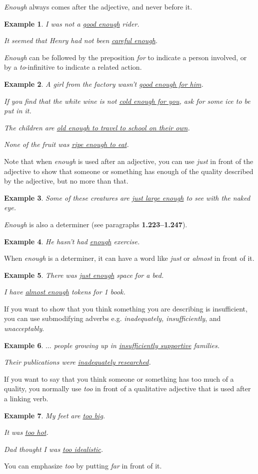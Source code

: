 \documentclass[oneside]{book}
\numberwithin{equation}{section}
\newtheorem{example}{Example}[section]
\begin{document}
\textit{Enough} always comes after the adjective, and never before it.
\begin{example}
    I was not a \underline{good enough} rider.
    
    It seemed that Henry had not been \underline{careful enough}.
\end{example}
\textit{Enough} can be followed by the preposition \textit{for} to indicate a person involved, or by a \textit{to}-infinitive to indicate a related action.
\begin{example}
    A girl from the factory wasn't \underline{good enough for him}.
    
    If you find that the white wine is not \underline{cold enough for you}, ask for some ice to be put in it.
    
    The children are \underline{old enough to travel to school on their own}.
    
    None of the fruit was \underline{ripe enough to eat}.
\end{example}
Note that when \textit{enough} is used after an adjective, you can use \textit{just} in front of the adjective to show that someone or something has enough of the quality described by the adjective, but no more than that.
\begin{example}
    Some of these creatures are \underline{just large enough} to see with the naked eye.
\end{example}
%
\noindent{} \textit{Enough} is also a determiner (see paragraphs \textbf{1.223--1.247}).
\begin{example}
    He hasn't had \underline{enough} exercise.
\end{example}
When \textit{enough} is a determiner, it can have a word like \textit{just} or \textit{almost} in front of it.
\begin{example}
    There was \underline{just enough} space for a bed.
    
    I have \underline{almost enough} tokens for 1 book.
\end{example}
%
\noindent{} If you want to show that you think something you are describing is insufficient, you can use submodifying adverbs e.g. \textit{inadequately, insufficiently}, and \textit{unacceptably}.
\begin{example}
    $\ldots$ people growing up in \underline{insufficiently supportive} families.
    
    Their publications were \underline{inadequately researched}.
\end{example}
%
\noindent{} If you want to say that you think someone or something has too much of a quality, you normally use \textit{too} in front of a qualitative adjective that is used after a linking verb.
\begin{example}
    My feet are \underline{too big}.
    
    It was \underline{too hot}.
    
    Dad thought I was \underline{too idealistic}.
\end{example}
You can emphasize \textit{too} by putting \textit{far} in front of it.
\end{document}
